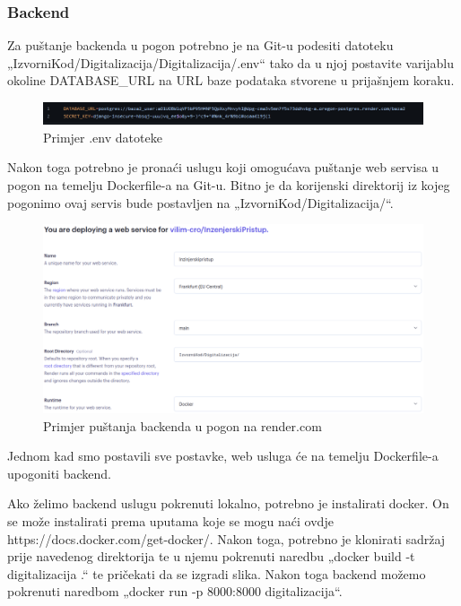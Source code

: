 			\subsubsection{Backend}

			Za puštanje backenda u pogon potrebno je na Git-u podesiti datoteku „IzvorniKod/Digitalizacija/Digitalizacija/.env“
			tako da u njoj postavite varijablu okoline DATABASE\_URL na URL baze podataka stvorene u prijašnjem koraku.

			\begin{figure}[H]
				\includegraphics[width=\textwidth]{slike/envFile.png}
				\caption{Primjer .env datoteke}
				\label{fig:env_datoteka}
			\end{figure}

			Nakon toga potrebno je pronaći uslugu koji omogućava puštanje web servisa u pogon na temelju Dockerfile-a na Git-u.
			Bitno je da korijenski direktorij iz kojeg pogonimo ovaj servis bude postavljen na „IzvorniKod/Digitalizacija/“. 

			\begin{figure}[H]
				\includegraphics[width=\textwidth]{slike/deployingBackend.png}
				\caption{Primjer puštanja backenda u pogon na render.com}
				\label{fig:deploying-backend}
			\end{figure}

			Jednom kad smo postavili sve postavke, web usluga će na temelju Dockerfile-a upogoniti backend.

			Ako želimo backend uslugu pokrenuti lokalno, potrebno je instalirati docker. On se može instalirati prema uputama
			koje se mogu naći ovdje https://docs.docker.com/get-docker/.
			Nakon toga, potrebno je klonirati sadržaj prije navedenog direktorija te u njemu pokrenuti naredbu
			„docker build -t digitalizacija .“ te pričekati da se izgradi slika. Nakon toga backend možemo pokrenuti naredbom
			„docker run -p 8000:8000 digitalizacija“.

